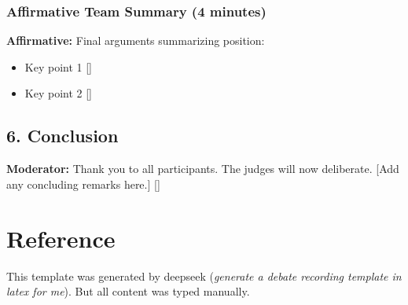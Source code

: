 \documentclass[12pt]{article}
\newcommand{\moderator}[1]{{\color{modcolor}\textbf{Moderator:} #1}}
\newcommand{\affirmative}[1]{{\color{affirmcolor}\textbf{Affirmative:} #1}}
\newcommand{\timestamp}{{\color{gray}\scriptsize[\currenttime]}}
\begin{document}
\subsubsection*{Affirmative Team Summary (4 minutes)}
\affirmative{Final arguments summarizing position:
\begin{itemize}
    \item Key point 1 \timestamp
    \item Key point 2 \timestamp
\end{itemize}}

\subsection*{6. Conclusion}
\moderator{Thank you to all participants. The judges will now deliberate. [Add any concluding remarks here.] \timestamp}

\section*{Reference}

This template was generated by deepseek (\textit{generate a debate recording template in latex for me}). But all content was typed manually.
\end{document}
